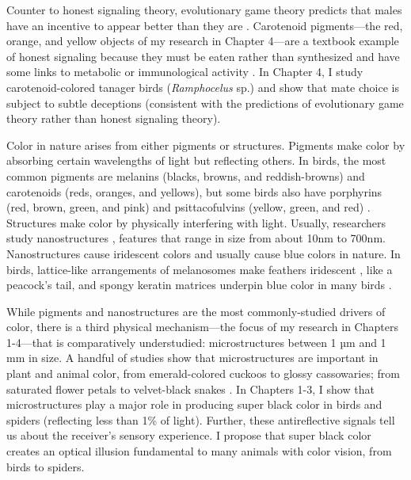 Counter to honest signaling theory, evolutionary game theory predicts that males have an incentive to appear better than they are \cite{Dawkins1991, Dawkins1978, Fisher1999, Hill1994, Krebs1984}. Carotenoid pigments—the red, orange, and yellow objects of my research in Chapter 4—are a textbook example of honest signaling \cite{Weaver2018} because they must be eaten rather than synthesized and have some links to metabolic or immunological activity \cite{Cantarero2017, Koch2018, Simons2012, Weaver2017, Weaver2018}. In Chapter 4, I study carotenoid-colored tanager birds (\emph{Ramphocelus} sp.) and show that mate choice is subject to subtle deceptions (consistent with the predictions of evolutionary game theory rather than honest signaling theory). 

\vspace{5mm}
\noindent{\textcolor{SchoolColor}{1.2 Physics of Color}}

Color in nature arises from either pigments or structures. Pigments make color by absorbing certain wavelengths of light but reflecting others. In birds, the most common pigments are melanins (blacks, browns, and reddish-browns) and carotenoids (reds, oranges, and yellows), but some birds also have porphyrins (red, brown, green, and pink) and psittacofulvins (yellow, green, and red) \cite{Cuthill2017, Hill2006, Hill2006a}. Structures make color by physically interfering with light. Usually, researchers study nanostructures \cite{Prum2006}, features that range in size from about 10nm to 700nm. Nanostructures cause iridescent colors and usually cause blue colors in nature. In birds, lattice-like arrangements of melanosomes make feathers iridescent \cite{Doucet2006, Stavenga2018}, like a peacock’s tail, and spongy keratin matrices underpin blue color in many birds \cite{Dufresne2009}.

While pigments and nanostructures are the most commonly-studied drivers of color, there is a third physical mechanism—the focus of my research in Chapters 1-4—that is comparatively understudied: microstructures between 1 µm and 1 mm in size. A handful of studies show that microstructures are important in plant and animal color, from emerald-colored cuckoos  \cite{Harvey2013} to glossy cassowaries\cite{Eliason2020}; from saturated flower petals \cite{Gorton1996} to velvet-black snakes \cite{Spinner2013}. In Chapters 1-3, I show that microstructures play a major role in producing super black color in birds and spiders (reflecting less than 1\% of light). Further, these antireflective signals tell us about the receiver’s sensory experience. I propose that super black color creates an optical illusion fundamental to many animals with color vision, from birds to spiders. 

